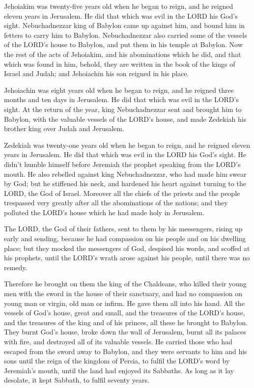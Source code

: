  Jehoiakim was twenty-five years old when he began to
reign, and he reigned eleven years in Jerusalem. He did that which was
evil in the LORD his God's sight.  Nebuchadnezzar king of
Babylon came up against him, and bound him in fetters to carry him to
Babylon.  Nebuchadnezzar also carried some of the vessels
of the LORD's house to Babylon, and put them in his temple at Babylon.
 Now the rest of the acts of Jehoiakim, and his
abominations which he did, and that which was found in him, behold, they
are written in the book of the kings of Israel and Judah; and Jehoiachin
his son reigned in his place.

 Jehoiachin was eight years old when he began to reign,
and he reigned three months and ten days in Jerusalem. He did that which
was evil in the LORD's sight.  At the return of the year,
king Nebuchadnezzar sent and brought him to Babylon, with the valuable
vessels of the LORD's house, and made Zedekiah his brother king over
Judah and Jerusalem.

 Zedekiah was twenty-one years old when he began to
reign, and he reigned eleven years in Jerusalem.  He did
that which was evil in the LORD his God's sight. He didn't humble
himself before Jeremiah the prophet speaking from the LORD's mouth.
 He also rebelled against king Nebuchadnezzar, who had
made him swear by God; but he stiffened his neck, and hardened his heart
against turning to the LORD, the God of Israel.  Moreover
all the chiefs of the priests and the people trespassed very greatly
after all the abominations of the nations; and they polluted the LORD's
house which he had made holy in Jerusalem.

 The LORD, the God of their fathers, sent to them by his
messengers, rising up early and sending, because he had compassion on
his people and on his dwelling place;  but they mocked
the messengers of God, despised his words, and scoffed at his prophets,
until the LORD's wrath arose against his people, until there was no
remedy.

 Therefore he brought on them the king of the Chaldeans,
who killed their young men with the sword in the house of their
sanctuary, and had no compassion on young man or virgin, old man or
infirm. He gave them all into his hand.  All the vessels
of God's house, great and small, and the treasures of the LORD's house,
and the treasures of the king and of his princes, all these he brought
to Babylon.  They burnt God's house, broke down the wall
of Jerusalem, burnt all its palaces with fire, and destroyed all of its
valuable vessels.  He carried those who had escaped from
the sword away to Babylon, and they were servants to him and his sons
until the reign of the kingdom of Persia,  to fulfil the
LORD's word by Jeremiah's mouth, until the land had enjoyed its
Sabbaths. As long as it lay desolate, it kept Sabbath, to fulfil seventy
years.

